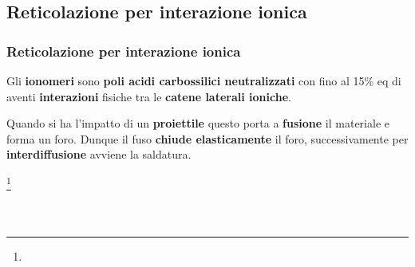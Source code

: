 \subsection{Reticolazione per interazione ionica}
\begin{frame}\frametitle{Reticolazione per interazione ionica}
Gli \textbf{ionomeri} sono \textbf{poli acidi carbossilici neutralizzati} con fino al 15\% eq di  aventi \textbf{interazioni} fisiche tra le \textbf{catene laterali ioniche}. 


Quando si ha l'impatto di un \textbf{proiettile} questo porta a \textbf{fusione} il materiale e forma un foro. Dunque il fuso \textbf{chiude elasticamente} il foro, successivamente per \textbf{interdiffusione} avviene la saldatura.  

\footnote{\tiny \leading{5pt} }
\begin{columns}
\begin{figure}{}\end{figure}
\begin{figure}{}\end{figure}
\end{columns}
\end{frame}




